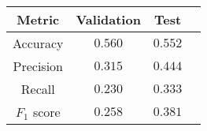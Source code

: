 \begin{tabular}{c|ccc}
    \textbf{Metric} & \textbf{Validation} & \textbf{Test} \\\hline
    Accuracy        & $0.560$             & $0.552$       \\
    Precision       & $0.315$             & $0.444$       \\
    Recall          & $0.230$             & $0.333$       \\
    $F_1$ score     & $0.258$             & $0.381$       \\
\end{tabular}
